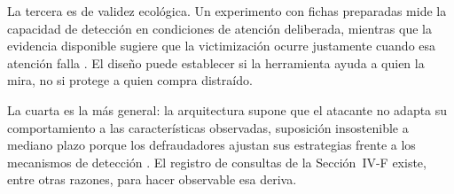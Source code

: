 La tercera es de validez ecológica. Un experimento con fichas preparadas mide la capacidad de
detección en condiciones de atención deliberada, mientras que la evidencia disponible sugiere
que la victimización ocurre justamente cuando esa atención falla \cite{ref27}. El diseño
puede establecer si la herramienta ayuda a quien la mira, no si protege a quien compra
distraído.

La cuarta es la más general: la arquitectura supone que el atacante no adapta su
comportamiento a las características observadas, suposición insostenible a mediano plazo
porque los defraudadores ajustan sus estrategias frente a los mecanismos de detección
\cite{ref28}. El registro de consultas de la Sección~IV-F existe, entre otras razones, para
hacer observable esa deriva.
